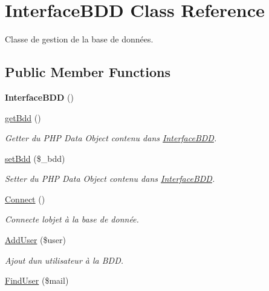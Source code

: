 \hypertarget{class_interface_b_d_d}{}\section{Interface\+B\+DD Class Reference}
\label{class_interface_b_d_d}


Classe de gestion de la base de données.  


\subsection*{Public Member Functions}
\begin{DoxyCompactItemize}
\item 
\mbox{\label{class_interface_b_d_d_ae2b03860390e293a5f6ba935a360ab2b}} 
{\bfseries Interface\+B\+DD} ()
\item 
\mbox{\hyperlink{class_interface_b_d_d_af3c2403a2cce83d85a2e494534115ddb}{get\+Bdd}} ()
\begin{DoxyCompactList}\small\item\em Getter du P\+HP Data Object contenu dans \mbox{\hyperlink{class_interface_b_d_d}{Interface\+B\+DD}}. \end{DoxyCompactList}\item 
\mbox{\hyperlink{class_interface_b_d_d_a91f08708d6515a9a029053f06c057ea4}{set\+Bdd}} (\$\+\_\+bdd)
\begin{DoxyCompactList}\small\item\em Setter du P\+HP Data Object contenu dans \mbox{\hyperlink{class_interface_b_d_d}{Interface\+B\+DD}}. \end{DoxyCompactList}\item 
\mbox{\hyperlink{class_interface_b_d_d_a9ac768272a054d6ef7e8436f1144b730}{Connect}} ()
\begin{DoxyCompactList}\small\item\em Connecte l\textquotesingle{}objet à la base de donnée. \end{DoxyCompactList}\item 
\mbox{\hyperlink{class_interface_b_d_d_a00c52bf73968bee971285a372892afb6}{Add\+User}} (\$user)
\begin{DoxyCompactList}\small\item\em Ajout d\textquotesingle{}un utilisateur à la B\+DD. \end{DoxyCompactList}\item 
\mbox{\hyperlink{class_interface_b_d_d_a8d979cbd1ec04e6ad7c3fed4d767e5a6}{Find\+User}} (\$mail)

\end{DoxyCompactItemize}
